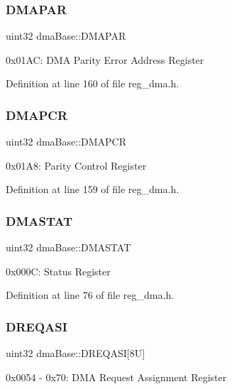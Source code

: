 \subsubsection{\texorpdfstring{D\+M\+A\+P\+AR}{DMAPAR}}
{\footnotesize\ttfamily uint32 dma\+Base\+::\+D\+M\+A\+P\+AR}

0x01\+AC\+: D\+MA Parity Error Address Register 

Definition at line 160 of file reg\+\_\+dma.\+h.

\mbox{\label{structdmaBase_aec7432dce6ada29c60a8a2d9877f3da1}} 
\subsubsection{\texorpdfstring{D\+M\+A\+P\+CR}{DMAPCR}}
{\footnotesize\ttfamily uint32 dma\+Base\+::\+D\+M\+A\+P\+CR}

0x01\+A8\+: Parity Control Register 

Definition at line 159 of file reg\+\_\+dma.\+h.

\mbox{\label{structdmaBase_a66e0413e244f88ed9659e1df26b039ef}} 
\subsubsection{\texorpdfstring{D\+M\+A\+S\+T\+AT}{DMASTAT}}
{\footnotesize\ttfamily uint32 dma\+Base\+::\+D\+M\+A\+S\+T\+AT}

0x000C\+: Status Register 

Definition at line 76 of file reg\+\_\+dma.\+h.

\mbox{\label{structdmaBase_aff761f82738fe183e60ab17ef6669e47}} 
\subsubsection{\texorpdfstring{D\+R\+E\+Q\+A\+SI}{DREQASI}}
{\footnotesize\ttfamily uint32 dma\+Base\+::\+D\+R\+E\+Q\+A\+SI\mbox{[}8\+U\mbox{]}}

0x0054 -\/ 0x70\+: D\+MA Request Assignment Register 

